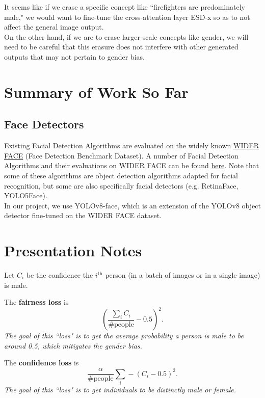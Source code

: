\documentclass[12pt]{amsart}
\begin{document}
\begin{discussion*}
It seems like if we erase a specific concept like ``firefighters are predominately male," we would want to fine-tune the cross-attention layer ESD-x so as to not affect the general image output. \\

On the other hand, if we are to erase larger-scale concepts like gender, we will need to be careful that this erasure does not interfere with other generated outputs that may not pertain to gender bias.
\end{discussion*}

\newpage

\section{Summary of Work So Far}

\subsection{Face Detectors}

Existing Facial Detection Algorithms are evaluated on the widely known \href{http://shuoyang1213.me/WIDERFACE/index.html}
{WIDER FACE} (Face Detection Benchmark Dataset). A number of Facial Detection Algorithms and their evaluations on WIDER FACE can be found \href{http://shuoyang1213.me/WIDERFACE/WiderFace_Results.html}{here}. Note that some of these algorithms are object detection algorithms adapted for facial recognition, but some are also specifically facial detectors (e.g. RetinaFace, YOLO5Face). \\

In our project, we use YOLOv8-face, which is an extension of the YOLOv8 object detector fine-tuned on the WIDER FACE dataset.

\newpage

\section{Presentation Notes}

\noindent
Let $C_i$ be the confidence the $i^{\text{th}}$ person (in a batch of images or in a single image) is male. \\


\begin{definition}\noindent The \textbf{fairness loss} is \[ \left( \frac{\sum\limits_i C_i}{\text{\# people}} - 0.5 \right)^2.\]
\textit{The goal of this ``loss" is to get the average probability a person is male to be around 0.5, which mitigates the gender bias.}
\end{definition}

\begin{definition}
\noindent The \textbf{confidence loss} is \[ \frac{\alpha}{\text{\# people}} \sum_i -(C_i - 0.5)^2.\]
\textit{The goal of this ``loss" is to get individuals to be distinctly male or female.}
\end{definition}
\end{document}
